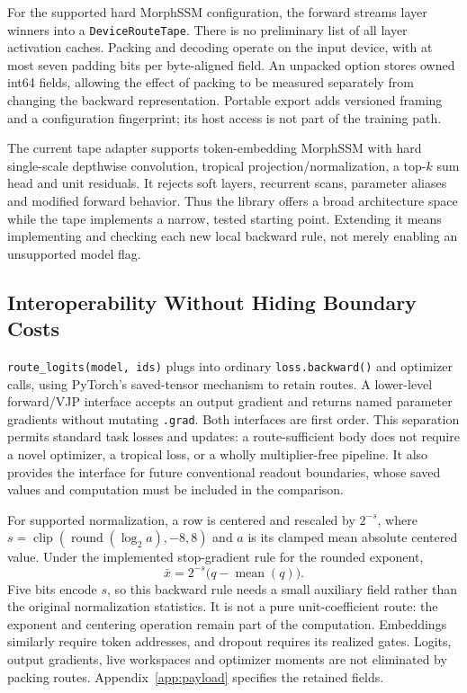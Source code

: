 \documentclass{article}
\theoremstyle{plain}
\theoremstyle{definition}
\theoremstyle{remark}
\newcommand{\code}[1]{\texttt{#1}}
\begin{document}
For the supported hard MorphSSM configuration, the forward streams layer
winners into a \code{DeviceRouteTape}. There is no preliminary list of
all layer activation caches. Packing and decoding operate on the input
device, with at most seven padding bits per byte-aligned field. An
unpacked option stores owned int64 fields, allowing the effect of packing
to be measured separately from changing the backward representation.
Portable export adds versioned framing and a configuration fingerprint;
its host access is not part of the training path.

The current tape adapter supports token-embedding MorphSSM with hard
single-scale depthwise convolution, tropical projection/normalization,
a top-$k$ sum head and unit residuals. It rejects soft layers, recurrent
scans, parameter aliases and modified forward behavior. Thus the library
offers a broad architecture space while the tape implements a narrow,
tested starting point. Extending it means implementing and checking each
new local backward rule, not merely enabling an unsupported model flag.

\subsection{Interoperability Without Hiding Boundary Costs}

\code{route\_logits(model, ids)} plugs into ordinary
\code{loss.backward()} and optimizer calls, using PyTorch's saved-tensor
mechanism to retain routes. A lower-level forward/VJP interface accepts an
output gradient and returns named parameter gradients without mutating
\code{.grad}. Both interfaces are first order. This separation permits
standard task losses and updates: a route-sufficient body does not require
a novel optimizer, a tropical loss, or a wholly multiplier-free pipeline.
It also provides the interface for future conventional readout boundaries,
whose saved values and computation must be included in the comparison.

For supported normalization, a row is centered and rescaled by $2^{-s}$,
where $s=\operatorname{clip}(\operatorname{round}(\log_2 a),-8,8)$ and $a$
is its clamped mean absolute centered value. Under the implemented
stop-gradient rule for the rounded exponent,
\begin{equation}
 \bar x=2^{-s}\bigl(q-\operatorname{mean}(q)\bigr).
\end{equation}
Five bits encode $s$, so this backward rule needs a small auxiliary field
rather than the original normalization statistics. It is not a pure
unit-coefficient route: the exponent and centering operation remain part
of the computation. Embeddings similarly require token addresses, and
dropout requires its realized gates. Logits, output gradients, live
workspaces and optimizer moments are not eliminated by packing routes.
Appendix~\ref{app:payload} specifies the retained fields.
\end{document}
